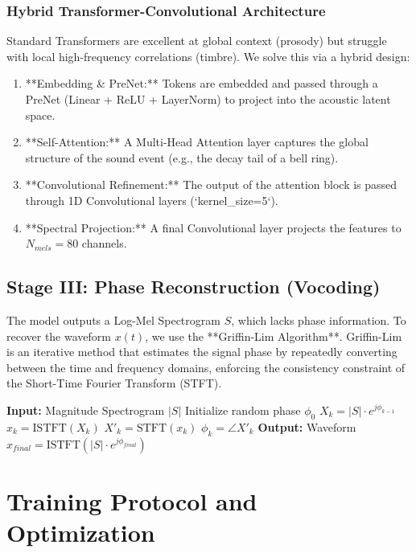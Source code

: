\documentclass[conference, onecolumn]{IEEEtran}
\begin{document}
\subsubsection{Hybrid Transformer-Convolutional Architecture}
Standard Transformers are excellent at global context (prosody) but struggle with local high-frequency correlations (timbre). We solve this via a hybrid design:
\begin{enumerate}
    \item **Embedding & PreNet:** Tokens are embedded and passed through a PreNet (Linear + ReLU + LayerNorm) to project into the acoustic latent space.
    \item **Self-Attention:** A Multi-Head Attention layer captures the global structure of the sound event (e.g., the decay tail of a bell ring).
    \item **Convolutional Refinement:** The output of the attention block is passed through 1D Convolutional layers (`kernel_size=5`).
    \item **Spectral Projection:** A final Convolutional layer projects the features to $N_{mels}=80$ channels.
\end{enumerate}

\subsection{Stage III: Phase Reconstruction (Vocoding)}
The model outputs a Log-Mel Spectrogram $S$, which lacks phase information. To recover the waveform $x(t)$, we use the **Griffin-Lim Algorithm**.
Griffin-Lim is an iterative method that estimates the signal phase by repeatedly converting between the time and frequency domains, enforcing the consistency constraint of the Short-Time Fourier Transform (STFT).
\begin{algorithm}[H]
\caption{Griffin-Lim Reconstruction}
\begin{algorithmic}
\STATE \textbf{Input:} Magnitude Spectrogram $|S|$
\STATE Initialize random phase $\phi_0$
    \STATE $X_k = |S| \cdot e^{j\phi_{k-1}}$
    \STATE $x_k = \text{ISTFT}(X_k)$
    \STATE $X'_{k} = \text{STFT}(x_k)$
    \STATE $\phi_k = \angle X'_{k}$
\ENDFOR
\STATE \textbf{Output:} Waveform $x_{final} = \text{ISTFT}(|S| \cdot e^{j\phi_{final}})$
\end{algorithmic}
\end{algorithm}

\section{Training Protocol and Optimization}
\end{document}
